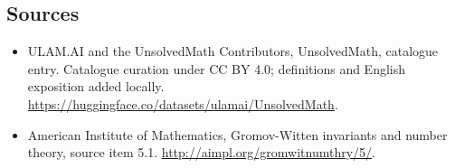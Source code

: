\documentclass[11pt]{article}
\begin{document}
\subsection{Sources}
\begin{itemize}
\item[\hypertarget{source:statement:1}{S1}] ULAM.AI and the UnsolvedMath Contributors, UnsolvedMath, catalogue entry. Catalogue curation under CC BY 4.0; definitions and English exposition added locally.
\url{https://huggingface.co/datasets/ulamai/UnsolvedMath}.
\item[\hypertarget{source:statement:2}{S2}] American Institute of Mathematics, Gromov-Witten invariants and number theory, source item 5.1.
\url{http://aimpl.org/gromwitnumthry/5/}.
\end{itemize}
\label{end:statement}
\end{document}

